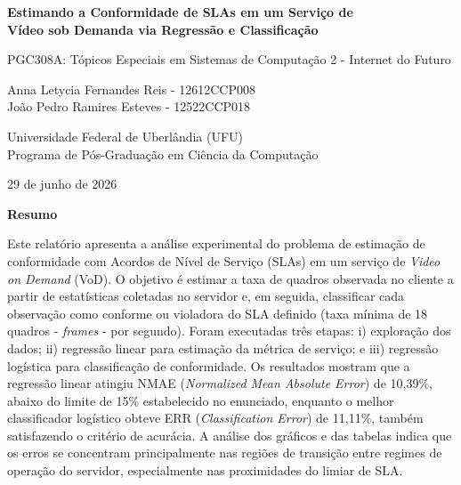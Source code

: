 \documentclass[11pt,a4paper]{article}
\begin{document}
\sloppy

\begin{titlepage}
\centering

\vspace*{1.0cm}

{\LARGE\bfseries
Estimando a Conformidade de SLAs em um Serviço de\\[0.2cm]
Vídeo sob Demanda via Regressão e Classificação
\par}

\vspace{0.6cm}

{\large
PGC308A: Tópicos Especiais em Sistemas de Computação 2 - Internet do Futuro
\par}

\vspace{1.2cm}

{\large
Anna Letycia Fernandes Reis - 12612CCP008\\[0.2cm]
João Pedro Ramires Esteves - 12522CCP018
\par}

\vspace{0.9cm}

{\large
Universidade Federal de Uberlândia (UFU)\\[0.15cm]
Programa de Pós-Graduação em Ciência da Computação
\par}

\vspace{0.8cm}

{\large
29 de junho de 2026
\par}

\vspace{1.0cm}

\begin{minipage}{0.88\textwidth}
    \centering
    \textbf{\large Resumo}
    
    \vspace{0.35cm}
    
    \small
    Este relatório apresenta a análise experimental do problema de estimação de conformidade com Acordos de Nível de Serviço (SLAs) em um serviço de \textit{Video on Demand} (VoD). O objetivo é estimar a taxa de quadros observada no cliente a partir de estatísticas coletadas no servidor e, em seguida, classificar cada observação como conforme ou violadora do SLA definido (taxa mínima de 18 quadros - \textit{frames} - por segundo). Foram executadas três etapas: i) exploração dos dados; ii) regressão linear para estimação da métrica de serviço; e  iii) regressão logística para classificação de conformidade. Os resultados mostram que a regressão linear atingiu NMAE (\textit{Normalized Mean Absolute Error}) de 10,39\%, abaixo do limite de 15\% estabelecido no enunciado, enquanto o melhor classificador logístico obteve ERR (\textit{Classification Error}) de 11,11\%, também satisfazendo o critério de acurácia. A análise dos gráficos e das tabelas indica que os erros se concentram principalmente nas regiões de transição entre regimes de operação do servidor, especialmente nas proximidades do limiar de SLA.
\end{minipage}

\vfill

\end{titlepage}
\end{document}
